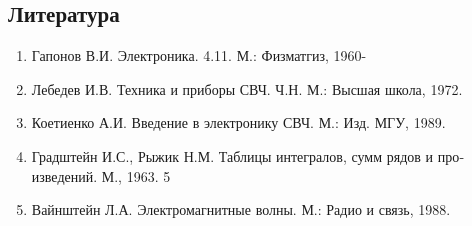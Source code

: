 \subsection{Литература}
\begin{enumerate}
	\item  Гапонов В.И. Электроника. 4.11. М.: Физматгиз, 1960-
	\item  Лебедев И.В. Техника и приборы СВЧ. Ч.Н. М.: Высшая школа, 1972.
	\item  Коетиенко А.И. Введение в электронику СВЧ. М.: Изд. МГУ, 1989.
	\item  Градштейн И.С., Рыжик Н.М. Таблицы интегралов, сумм рядов и про­
	изведений. М., 1963. 5
	\item  Вайнштейн Л.А. Электромагнитные волны. М.: Радио и связь, 1988.
\end{enumerate}
